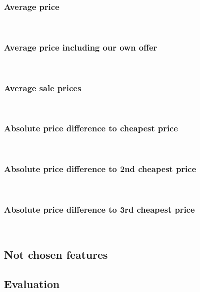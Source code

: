 \subsubsection{Average price}
	~\\
\subsubsection{Average price including our own offer}
	~\\
\subsubsection{Average sale prices}
	~\\
\subsubsection{Absolute price difference to cheapest price}
	~\\
\subsubsection{Absolute price difference to 2nd cheapest price}
	~\\
\subsubsection{Absolute price difference to 3rd cheapest price}
	~\\
\subsection{Not chosen features}
\subsection{Evaluation}
